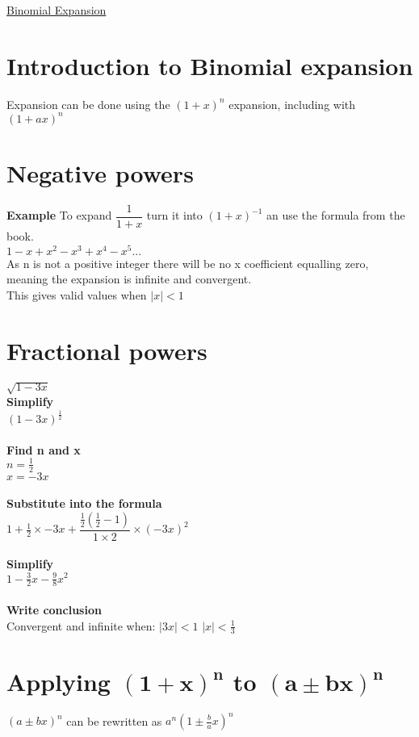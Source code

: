 \documentclass{article}[18pt]
\begin{document}
\begin{center}
\underline{\huge Binomial Expansion}
\end{center}
\section{Introduction to Binomial expansion}
Expansion can be done using the $(1+x)^n$ expansion, including with $(1+ax)^n$
\section{Negative powers}
\textbf{Example}
To expand $\dfrac{1}{1+x}$ turn it into $(1+x)^{-1}$ an use the formula from the book.\\
$1-x+x^2-x^3+x^4-x^5...$\\
As n is not a positive integer there will be no x coefficient equalling zero, meaning the expansion is infinite and convergent.\\
This gives valid values when $|x|<1$
\section{Fractional powers}
$\sqrt{1-3x}$\\
\textbf{Simplify}\\
$(1-3x)^{\frac{1}{2}}$\\
\\
\textbf{Find n and x}\\
$n=\frac{1}{2}$\\
$x=-3x$\\
\\
\textbf{Substitute into the formula}\\
$1+\frac{1}{2}\times-3x+\dfrac{\frac{1}{2}(\frac{1}{2}-1)}{1\times2}\times(-3x)^2$\\
\\
\textbf{Simplify}\\
$1-\frac{3}{2}x-\frac{9}{8}x^2$\\
\\
\textbf{Write conclusion}\\
Convergent and infinite when:
$|3x|<1$ $|x|<\frac{1}{3}$
\section{Applying $\mathbf{(1+x)^n}$ to $\mathbf{(a\pm bx)^n}$}
$(a\pm bx)^n$ can be rewritten as $a^n(1\pm\frac{b}{a}x)^n$
\end{document}
